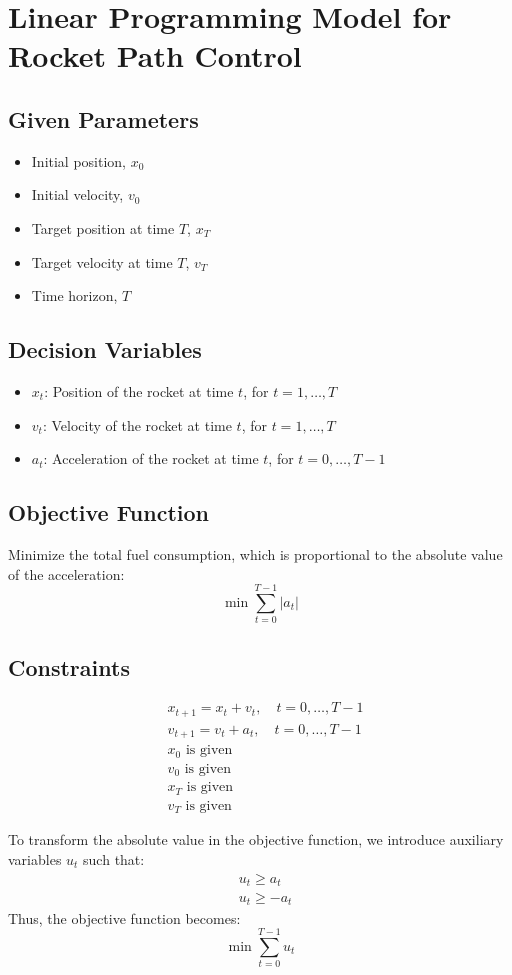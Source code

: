 \documentclass{article}
\begin{document}
\section*{Linear Programming Model for Rocket Path Control}

\subsection*{Given Parameters}
\begin{itemize}
    \item Initial position, $x_0$
    \item Initial velocity, $v_0$
    \item Target position at time $T$, $x_T$
    \item Target velocity at time $T$, $v_T$
    \item Time horizon, $T$
\end{itemize}

\subsection*{Decision Variables}
\begin{itemize}
    \item $x_t$: Position of the rocket at time $t$, for $t = 1, \ldots, T$
    \item $v_t$: Velocity of the rocket at time $t$, for $t = 1, \ldots, T$
    \item $a_t$: Acceleration of the rocket at time $t$, for $t = 0, \ldots, T-1$
\end{itemize}

\subsection*{Objective Function}
Minimize the total fuel consumption, which is proportional to the absolute value of the acceleration:
\[
\min \sum_{t=0}^{T-1} |a_t|
\]

\subsection*{Constraints}
\begin{align}
    & x_{t+1} = x_t + v_t, \quad t = 0, \ldots, T-1 \\
    & v_{t+1} = v_t + a_t, \quad t = 0, \ldots, T-1 \\
    & x_0 \text{ is given} \\
    & v_0 \text{ is given} \\
    & x_T \text{ is given} \\
    & v_T \text{ is given}
\end{align}

To transform the absolute value in the objective function, we introduce auxiliary variables $u_t$ such that:
\begin{align}
    & u_t \geq a_t \\
    & u_t \geq -a_t
\end{align}
Thus, the objective function becomes:
\[
\min \sum_{t=0}^{T-1} u_t
\]
\end{document}
